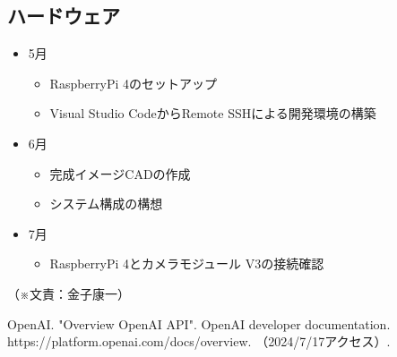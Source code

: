 \documentclass[12pt,a4paper]{report}
\newcommand{\Writer}[1]{
  \normalsize
  \begin{flushright}
    （※文責：#1）
  \end{flushright}
}
\begin{document}
\subsection{ハードウェア}
\noindent\space
\begin{itemize}
  \item 5月
  \begin{itemize}
    \item RaspberryPi 4のセットアップ
    \item Visual Studio CodeからRemote SSHによる開発環境の構築
  \end{itemize}
  \item 6月
  \begin{itemize}
    \item 完成イメージCADの作成
    \item システム構成の構想
  \end{itemize}
  \item 7月
  \begin{itemize}
    \item RaspberryPi 4とカメラモジュール V3の接続確認
  \end{itemize}
\end{itemize}
\Writer{金子康一}

\newpage
{}
\begin{thebibliography}{1}
   OpenAI. "Overview OpenAI API". OpenAI developer documentation. https://platform.openai.com/docs/overview. （2024/7/17アクセス）.
\end{thebibliography}
\end{document}
